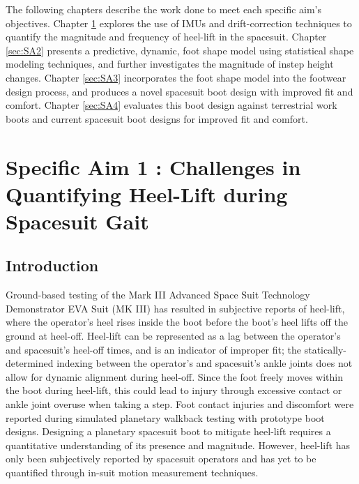\documentclass[defaultstyle,11pt]{thesis}
\begin{document}
The following chapters describe the work done to meet each specific aim's objectives.
Chapter \ref{sec:SA1} explores the use of IMUs and drift-correction techniques to quantify the magnitude and frequency of heel-lift in the spacesuit.
Chapter \ref{sec:SA2} presents a predictive, dynamic, foot shape model using statistical shape modeling techniques, and further investigates the magnitude of instep height changes.
Chapter \ref{sec:SA3} incorporates the foot shape model into the footwear design process, and produces a novel spacesuit boot design with improved fit and comfort.
Chapter \ref{sec:SA4} evaluates this boot design against terrestrial work boots and current spacesuit boot designs for improved fit and comfort.

\hypertarget{sec:SA1}{%
\chapter{Specific Aim 1 : Challenges in Quantifying Heel-Lift during Spacesuit Gait}\label{sec:SA1}}

\hypertarget{introduction}{%
\section{Introduction}\label{introduction}}

Ground-based testing of the Mark III Advanced Space Suit Technology Demonstrator EVA Suit (MK III) has resulted in subjective reports of heel-lift, where the operator's heel rises inside the boot before the boot's heel lifts off the ground at heel-off\citep{Fineman2018}.
Heel-lift can be represented as a lag between the operator's and spacesuit's heel-off times, and is an indicator of improper fit; the statically-determined indexing between the operator's and spacesuit's ankle joints does not allow for dynamic alignment during heel-off.
Since the foot freely moves within the boot during heel-lift, this could lead to injury through excessive contact or ankle joint overuse when taking a step.
Foot contact injuries and discomfort were reported during simulated planetary walkback testing with prototype boot designs\citep{Chappell2017}.
Designing a planetary spacesuit boot to mitigate heel-lift requires a quantitative understanding of its presence and magnitude.
However, heel-lift has only been subjectively reported by spacesuit operators and has yet to be quantified through in-suit motion measurement techniques.
\end{document}
